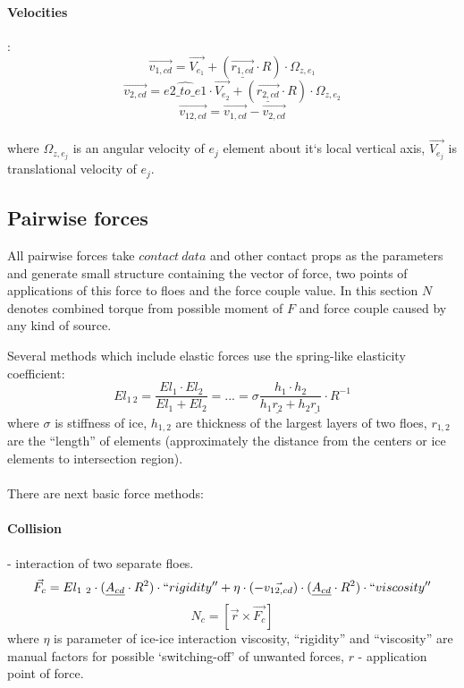 \paragraph{Velocities}:
\begin{equation}
 \vec{v_{1,cd}} = \vec{V_{e_1}} + (\underline{\vec{r_{1,cd}}} \cdot R) \cdot \Omega_{z,e_1}
 \end{equation}
\begin{equation}
 \vec{v_{2,cd}} = \hat{e2\_to\_e1} \cdot \vec{V_{e_2}} + (\underline{\vec{r_{2,cd}}} \cdot R) \cdot \Omega_{z,e_2}
 \end{equation}
\begin{equation}
 \vec{v_{12,cd}} = \vec{v_{1,cd}} - \vec{v_{2,cd}}
\end{equation}
\\where $\Omega_{z,e_j}$ is an angular velocity of $e_j$ element about it`s local
vertical axis, $\vec{V_{e_j}}$ is translational velocity of $e_j$.

\subsection{Pairwise forces}

All pairwise forces take $contact\ data$ and other contact props 
as the parameters and generate small structure containing 
the vector of force, two points of applications of this force
to floes and the force couple value. In this section $N$ denotes 
combined torque from possible moment of $F$ and force couple caused 
by any kind of source.

Several methods which include elastic forces use the spring-like 
elasticity coefficient:
\begin{equation}
 El_{1\ 2} = \frac{El_1 \cdot El_2}{El_1 + El_2} =...= 
 \sigma \frac{h_1 \cdot h_2}{h_1 \underline{r_2} + h_2 \underline{r_1}} \cdot R^{-1}
\end{equation}
where $\sigma$ is stiffness of ice, $h_{1, 2}$ are thickness of the 
largest layers of two floes, $r_{1, 2}$ are the ``length'' of elements
(approximately the distance from the centers or ice elements to
intersection region).
\\
\\
There are next basic force methods:

\paragraph{Collision} - interaction of two separate floes.
\begin{equation}
 \vec{F_c} = El_{1\ 2} \cdot (\underline{A_{cd}} \cdot R^2) \cdot ``rigidity'' +
 \eta \cdot (-\vec{v_{1 2,cd}}) \cdot ( \underline{A_{cd}} \cdot R^2) \cdot ``viscosity''
\end{equation}
\begin{equation}
 N_c = [\vec{r} \times \vec{F_c}]
\end{equation}
where $\eta$ is parameter of ice-ice interaction viscosity, 
``rigidity'' and ``viscosity'' are manual factors for possible 
`switching-off' of unwanted forces, $r$ - application point of force.

